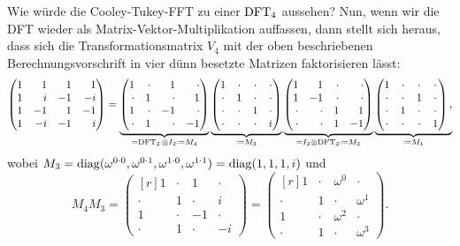 Wie würde die Cooley-Tukey-FFT zu einer $ \operatorname{DFT}_{4} $ aussehen? Nun, wenn wir die DFT wieder als
Matrix-Vektor-Multiplikation auffassen, dann stellt sich heraus, dass sich die Transformationsmatrix
$ V_{4} $ mit der oben beschriebenen Berechnungsvorschrift in vier dünn besetzte Matrizen 
faktorisieren lässt:
\[
\begin{pmatrix*}[r]
      1 &  1 &  1 &  1 \\
      1 &  i & -1 & -i \\
      1 & -1 &  1 & -1 \\
      1 & -i & -1 & i
    \end{pmatrix*}
=
\underbrace{
\begin{pmatrix*}[r]
1 & \cdot & 1 & \cdot \\ \cdot & 1 & \cdot & 1 \\ 1 & \cdot & -1 & \cdot \\ \cdot & 1 & \cdot & -1
\end{pmatrix*}
}_{= \DFT_{2} \otimes I_{2} \coloneqq M_{4}}
\underbrace{
\begin{pmatrix}
1 & \cdot & \cdot & \cdot \\ \cdot & 1 & \cdot & \cdot \\ \cdot & \cdot & 1 & \cdot \\ \cdot & 
\cdot & \cdot & i
\end{pmatrix}
}_{\coloneqq M_{3}}
\underbrace{
\begin{pmatrix*}[r]
1 & 1 & \cdot & \cdot \\ 1 & -1 & \cdot & \cdot \\ \cdot & \cdot & 1 & 1 \\ \cdot & \cdot & 1 & -1
\end{pmatrix*}
}_{= I_{2} \otimes \DFT_{2} \coloneqq M_{2}}
\underbrace{
\begin{pmatrix}
1 & \cdot & \cdot & \cdot \\ \cdot & \cdot & 1 & \cdot \\ \cdot & 1 & \cdot & \cdot \\ \cdot & 
\cdot & \cdot & 1
\end{pmatrix},
}_{\coloneqq M_{1}}
\]
wobei $ M_{3} = \operatorname{diag}(\omega^{0 \cdot 0}, \omega^{0 \cdot 1}, \omega^{1 \cdot 0}, 
\omega^{1 \cdot 1}) = \operatorname{diag}(1,1,1,i) $ und
\[
  M_{4} M_{3} = \begin{pmatrix*}[r]
    1 & \cdot & 1 & \cdot \\
    \cdot & 1 & \cdot & i \\
    1 & \cdot & -1 & \cdot \\
    \cdot & 1 & \cdot & -i
  \end{pmatrix*} = \begin{pmatrix*}[r]
    1 & \cdot & \omega^{0} & \cdot \\
    \cdot & 1 & \cdot & \omega^{1} \\
    1 & \cdot & \omega^{2} & \cdot \\
    \cdot & 1 & \cdot & \omega^{3}
  \end{pmatrix*}.
\]
